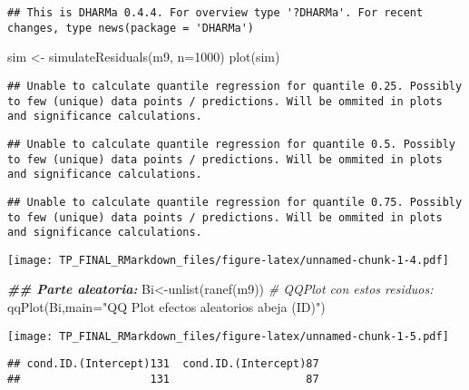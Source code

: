 \documentclass[
]{article}
\newenvironment{Shaded}{\begin{snugshade}}{\end{snugshade}}
\newcommand{\AttributeTok}[1]{\textcolor[rgb]{0.77,0.63,0.00}{#1}}
\newcommand{\CommentTok}[1]{\textcolor[rgb]{0.56,0.35,0.01}{\textit{#1}}}
\newcommand{\DecValTok}[1]{\textcolor[rgb]{0.00,0.00,0.81}{#1}}
\newcommand{\DocumentationTok}[1]{\textcolor[rgb]{0.56,0.35,0.01}{\textbf{\textit{#1}}}}
\newcommand{\FunctionTok}[1]{\textcolor[rgb]{0.00,0.00,0.00}{#1}}
\newcommand{\NormalTok}[1]{#1}
\newcommand{\OtherTok}[1]{\textcolor[rgb]{0.56,0.35,0.01}{#1}}
\newcommand{\StringTok}[1]{\textcolor[rgb]{0.31,0.60,0.02}{#1}}
\begin{document}
\begin{verbatim}
## This is DHARMa 0.4.4. For overview type '?DHARMa'. For recent changes, type news(package = 'DHARMa')
\end{verbatim}

\begin{Shaded}
\begin{Highlighting}[]
\NormalTok{sim }\OtherTok{\textless{}{-}} \FunctionTok{simulateResiduals}\NormalTok{(m9, }\AttributeTok{n=}\DecValTok{1000}\NormalTok{)}
\FunctionTok{plot}\NormalTok{(sim)}
\end{Highlighting}
\end{Shaded}

\begin{verbatim}
## Unable to calculate quantile regression for quantile 0.25. Possibly to few (unique) data points / predictions. Will be ommited in plots and significance calculations.
\end{verbatim}

\begin{verbatim}
## Unable to calculate quantile regression for quantile 0.5. Possibly to few (unique) data points / predictions. Will be ommited in plots and significance calculations.
\end{verbatim}

\begin{verbatim}
## Unable to calculate quantile regression for quantile 0.75. Possibly to few (unique) data points / predictions. Will be ommited in plots and significance calculations.
\end{verbatim}

\texttt{[image: TP\_FINAL\_RMarkdown\_files/figure-latex/unnamed-chunk-1-4.pdf]}

\begin{Shaded}
\begin{Highlighting}[]
\DocumentationTok{\#\# Parte aleatoria:}
\NormalTok{Bi}\OtherTok{\textless{}{-}}\FunctionTok{unlist}\NormalTok{(}\FunctionTok{ranef}\NormalTok{(m9))}
\CommentTok{\# QQPlot con estos residuos:}
\FunctionTok{qqPlot}\NormalTok{(Bi,}\AttributeTok{main=}\StringTok{"QQ Plot efectos aleatorios abeja (ID)"}\NormalTok{)}
\end{Highlighting}
\end{Shaded}

\texttt{[image: TP\_FINAL\_RMarkdown\_files/figure-latex/unnamed-chunk-1-5.pdf]}

\begin{verbatim}
## cond.ID.(Intercept)131  cond.ID.(Intercept)87 
##                    131                     87
\end{verbatim}
\end{document}
